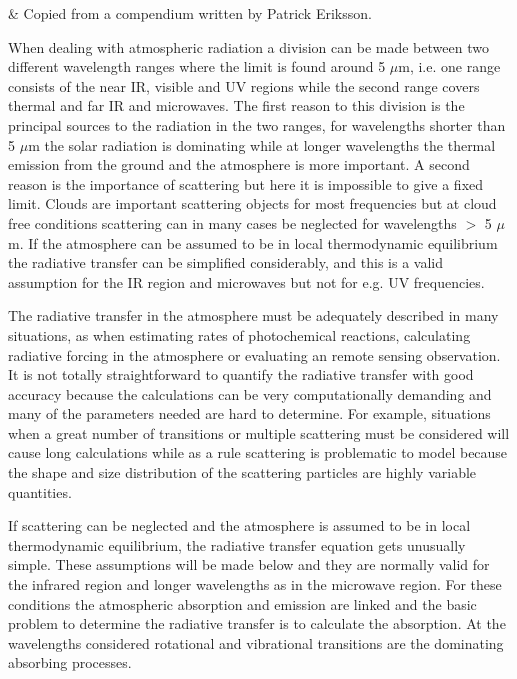  \label{sec:rte_theory}


 & Copied from a compendium written by Patrick Eriksson.\\
\stophistory


 When dealing with atmospheric radiation a division can be made
 between two different wavelength ranges where the limit is found
 around 5 $\mu$m, i.e. one range consists of the near IR, visible and UV
 regions while the second range covers thermal and far IR and
 microwaves. The first reason to this division is the principal
 sources to the radiation in the two ranges, for wavelengths shorter
 than 5 $\mu$m the solar radiation is dominating while at longer
 wavelengths the thermal emission from the ground and the atmosphere
 is more important. A second reason is the importance of scattering
 but here it is impossible to give a fixed limit. Clouds are important
 scattering objects for most frequencies but at cloud free conditions
 scattering can in many cases be neglected for wavelengths $>$ 5 $\mu$m. If
 the atmosphere can be assumed to be in local thermodynamic
 equilibrium the radiative transfer can be simplified considerably,
 and this is a valid assumption for the IR region and microwaves but
 not for e.g. UV frequencies.
 
 The radiative transfer in the atmosphere must be adequately described
 in many situations, as when estimating rates of photochemical
 reactions, calculating radiative forcing in the atmosphere or
 evaluating an remote sensing observation. It is not totally
 straightforward to quantify the radiative transfer with good accuracy
 because the calculations can be very computationally demanding and
 many of the parameters needed are hard to determine. For example,
 situations when a great number of transitions or multiple scattering
 must be considered will cause long calculations while as a rule
 scattering is problematic to model because the shape and size
 distribution of the scattering particles are highly variable
 quantities.  
 
 If scattering can be neglected and the atmosphere is assumed to be in
 local thermodynamic equilibrium, the radiative transfer equation gets
 unusually simple. These assumptions will be made below and
 they are normally valid for the infrared region and longer
 wavelengths as in the microwave region. For these conditions the
 atmospheric absorption and emission are linked and the basic problem
 to determine the radiative transfer is to calculate the absorption.
 At the wavelengths considered rotational and vibrational transitions
 are the dominating absorbing processes.


